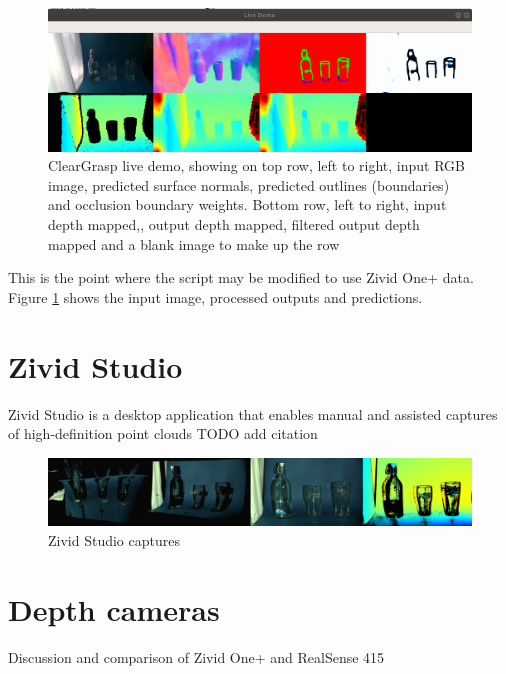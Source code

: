 \begin{figure}[h!]
\centering
\includegraphics[width=\textwidth]{Figures/ClearGraspLiveDemoForReport.png}
\caption{ClearGrasp live demo, showing on top row, left to right, input RGB image, predicted surface normals, predicted outlines (boundaries) and occlusion boundary weights. Bottom row, left to right, input depth mapped,, output depth mapped, filtered output depth mapped and a blank image to make up the row}
\label{fig:ClearGraspLiveDemoForReport}
\end{figure}

This is the point where the script may be modified to use Zivid One+ data. Figure \ref{fig:ClearGraspLiveDemoForReport} shows the input image, processed outputs and predictions. 

\section{Zivid Studio}
Zivid Studio is a desktop application that enables manual and assisted captures of high-definition point clouds
TODO add citation

\begin{figure}[h!]
\centering
\includegraphics[width=\textwidth]{Figures/ZividStudio.png}
\caption{Zivid Studio captures}
\label{fig:ZividStudio}
\end{figure}

\section{Depth cameras}
Discussion and comparison of Zivid One+ and RealSense 415







